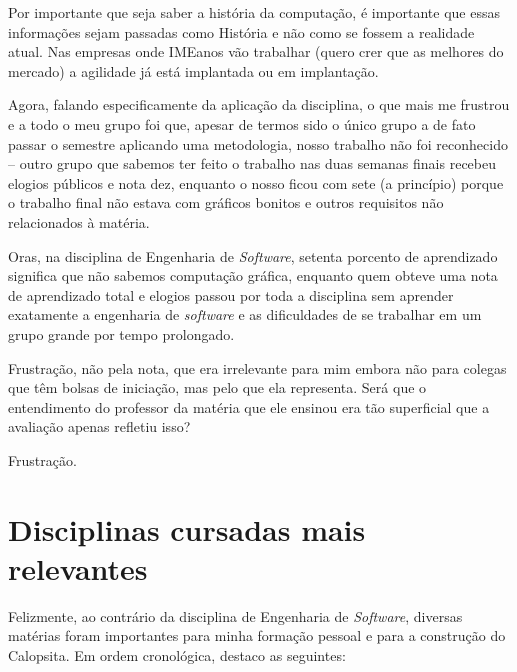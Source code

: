 \documentclass[titlepage,a4paper]{article}
\newcommand{\software}{\textit{software}}
\newcommand{\calopsita}{Calopsita}
\begin{document}
Por importante que seja saber a história da computação, é importante que essas informações sejam passadas como História e não como se fossem a realidade atual. Nas empresas onde IMEanos vão trabalhar (quero crer que as melhores do mercado) a agilidade já está implantada ou em implantação.

Agora, falando especificamente da aplicação da disciplina, o que mais me frustrou e a todo o meu grupo foi que, apesar de termos sido o único grupo a de fato passar o semestre aplicando uma metodologia, nosso trabalho não foi reconhecido -- outro grupo que sabemos ter feito o trabalho nas duas semanas finais recebeu elogios públicos e nota dez, enquanto o nosso ficou com sete (a princípio) porque o trabalho final não estava com gráficos bonitos e outros requisitos não relacionados à matéria.

Oras, na disciplina de Engenharia de \textit{Software}, setenta porcento de aprendizado significa que não sabemos computação gráfica, enquanto quem obteve uma nota de aprendizado total e elogios passou por toda a disciplina sem aprender exatamente a engenharia de \software{} e as dificuldades de se trabalhar em um grupo grande por tempo prolongado.

Frustração, não pela nota, que era irrelevante para mim embora não para colegas que têm bolsas de iniciação, mas pelo que ela representa. Será que o entendimento do professor da matéria que ele ensinou era tão superficial que a avaliação apenas refletiu isso?

Frustração.

\section{Disciplinas cursadas mais relevantes}

Felizmente, ao contrário da disciplina de Engenharia de \textit{Software}, diversas matérias foram importantes para minha formação pessoal e para a construção do \calopsita{}. Em ordem cronológica, destaco as seguintes:
\end{document}
